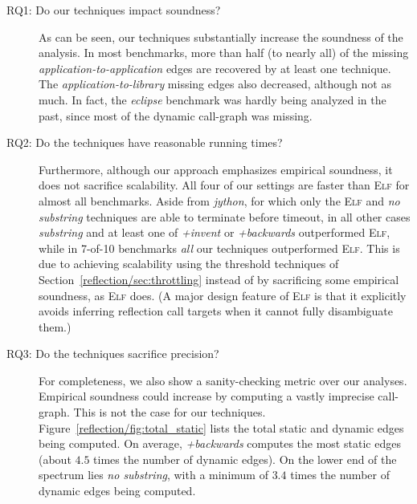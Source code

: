 \begin{description}
\item[RQ1: Do our techniques impact soundness?]
  As can be seen, our techniques substantially increase the soundness
  of the analysis.  In most benchmarks, more than half (to nearly all)
  of the missing \emph{application-to-application} edges are
  recovered by at least one technique. The
  \emph{application-to-library} missing edges also decreased, although
  not as much.  In fact, the \emph{eclipse} benchmark was hardly being
  analyzed in the past, since most of the dynamic call-graph was
  missing.

\item[RQ2: Do the techniques have reasonable running times?]
  Furthermore, although our approach emphasizes empirical soundness,
  it does not sacrifice scalability. All four of our settings are
  faster than \textsc{Elf} for almost all benchmarks. Aside from
  \emph{jython}, for which only the \textsc{Elf} and \emph{no
    substring} techniques are able to terminate before timeout, in
  all other cases \emph{substring} and at least one of \emph{+invent}
  or \emph{+backwards} outperformed \textsc{Elf}, while in 7-of-10
  benchmarks \emph{all} our techniques outperformed \textsc{Elf}.
  This is due to achieving scalability using the threshold techniques
  of Section~\ref{reflection/sec:throttling} instead of by sacrificing some
  empirical soundness, as \textsc{Elf} does. (A major design feature
  of \textsc{Elf} is that it explicitly avoids inferring reflection
  call targets when it cannot fully disambiguate them.)


\item[RQ3: Do the techniques sacrifice precision?]
  For completeness, we also show a sanity-checking metric over
  our analyses. Empirical soundness could
  increase by computing a vastly imprecise call-graph. This is not the
  case for our techniques. Figure~\ref{reflection/fig:total_static} lists the
  total static and dynamic edges being computed. On average,
  \emph{+backwards} computes the most static edges (about $4.5$ times
  the number of dynamic edges). On the lower end of the spectrum lies
  \emph{no substring}, with a minimum of $3.4$ times the number of
  dynamic edges being computed.

\end{description}

